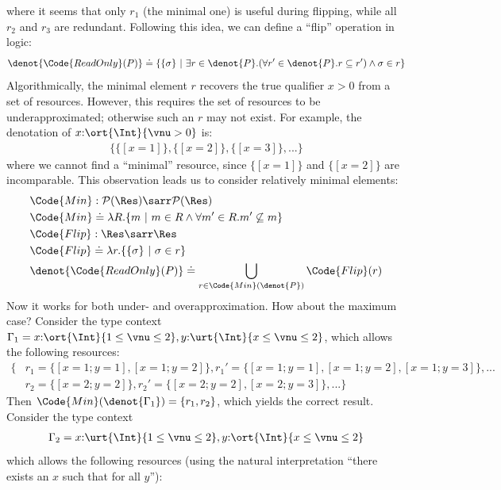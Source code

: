 where it seems that only $r_1$ (the minimal one) is useful during flipping, while all $r_2$ and $r_3$ are redundant. Following this idea, we can define a ``flip'' operation in logic:
\begin{align*}
  \denot{ \Code{ReadOnly}(P) } \doteq \{ \{\sigma\} ~|~ \exists r \in \denot{P}. (\forall r' \in \denot{P}. r \subseteq r') \land \sigma \in r \}
\end{align*}\noindent
Algorithmically, the minimal element $r$ recovers the true qualifier $x > 0$ from a set of resources. However, this requires the set of resources to be underapproximated; otherwise such an $r$ may not exist. For example, the denotation of $x{:}\ort{\Int}{\vnu > 0}$ is:
\begin{align*}
  \{\{[x = 1]\}, \{[x = 2]\}, \{[x = 3]\}, ... \}
\end{align*}\noindent
where we cannot find a ``minimal'' resource, since $\{[x = 1]\}$ and $\{[x = 2]\}$ are incomparable. This observation leads us to consider relatively minimal elements:
\begin{align*}
  &\Code{Min}: \mathcal{P}(\Res) \sarr \mathcal{P}(\Res)
  \\&\Code{Min}\doteq \lambda R.\{ m ~|~ m \in R \land \forall m' \in R. m' \not\subseteq m \}
  \\&\Code{Flip}: \Res \sarr \Res
  \\&\Code{Flip}\doteq \lambda r.\{ \{\sigma\} ~|~ \sigma \in r \} 
  \\&\denot{ \Code{ReadOnly}(P) } \doteq \bigcup_{r \in \Code{Min}(\denot{P})} \Code{Flip}(r)
\end{align*}\noindent
Now it works for both under- and overapproximation. How about the maximum case? Consider the type context $\Gamma_1 = x{:}\ort{\Int}{1 \leq \vnu \leq 2}, y{:}\urt{\Int}{x \leq \vnu \leq 2}$, which allows the following resources:
\begin{align*}
  \{&r_1 = \{[x = 1;y = 1], [x = 1;y = 2]\}, r_1' = \{[x = 1;y = 1], [x = 1;y = 2], [x = 1;y = 3]\}, ...\\
    &r_2 = \{[x = 2;y = 2]\}, r_2' = \{[x = 2;y = 2], [x = 2;y = 3]\}, ...\}
\end{align*}\noindent
Then $\Code{Min}(\denot{\Gamma_1}) = \{r_1, r_2\}$, which yields the correct result. Consider the type context 
\begin{align*}
\Gamma_2 = x{:}\urt{\Int}{1 \leq \vnu \leq 2}, y{:}\ort{\Int}{x \leq \vnu \leq 2}
\end{align*}\noindent
which allows the following resources (using the natural interpretation ``there exists an $x$ such that for all $y$''):
